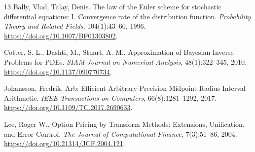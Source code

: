 \begin{thebibliography}{13}
Bally, Vlad, Talay, Denis.
The law of the {Euler} scheme for stochastic differential equations: {I}. {Convergence} rate of the distribution function.
\emph{Probability Theory and Related Fields}, 104(1):43--60, 1996.
\url{https://doi.org/10.1007/BF01303802}.

Cotter, S. L., Dashti, M., Stuart, A. M..
Approximation of {Bayesian} Inverse Problems for {PDEs}.
\emph{SIAM Journal on Numerical Analysis}, 48(1):322--345, 2010.
\url{https://doi.org/10.1137/090770734}.

Johansson, Fredrik.
{Arb}: Efficient Arbitrary-Precision Midpoint-Radius Interval Arithmetic.
\emph{IEEE Transactions on Computers}, 66(8):1281--1292, 2017.
\url{https://doi.org/10.1109/TC.2017.2690633}.

Lee, Roger W..
Option Pricing by Transform Methods: Extensions, Unification, and Error Control.
\emph{The Journal of Computational Finance}, 7(3):51--86, 2004.
\url{https://doi.org/10.21314/JCF.2004.121}.

\end{thebibliography}
